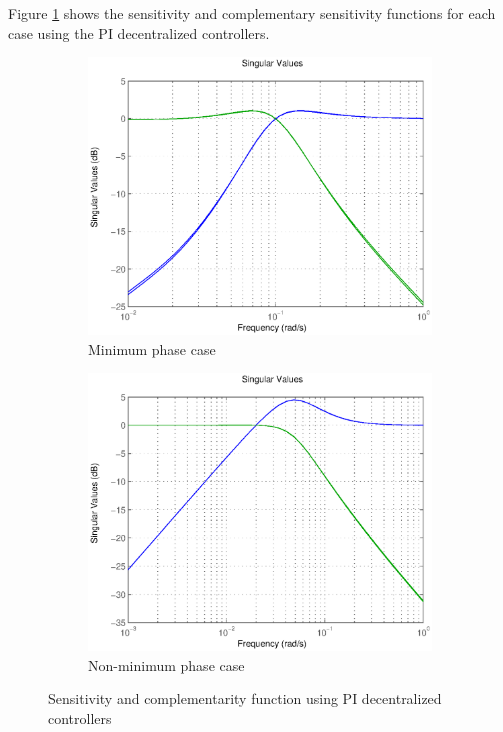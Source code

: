 Figure \ref{sensfunction} shows the sensitivity and complementary sensitivity functions for each case using the PI decentralized controllers.

\begin{figure}[h!t]
        \centering
        \begin{subfigure}[b]{0.45\columnwidth}
                \includegraphics[width=\columnwidth]{fig/sensitivity_dyn_minphase.eps}
                \caption{Minimum phase case}
        \end{subfigure}
        \begin{subfigure}[b]{0.45\columnwidth}
                \includegraphics[width=\columnwidth]{fig/sensitivity_dyn_nonminphase.eps}
                \caption{Non-minimum phase case}
        \end{subfigure}
        \caption{Sensitivity and complementarity function using PI decentralized controllers}
        \label{sensfunction}
\end{figure}


